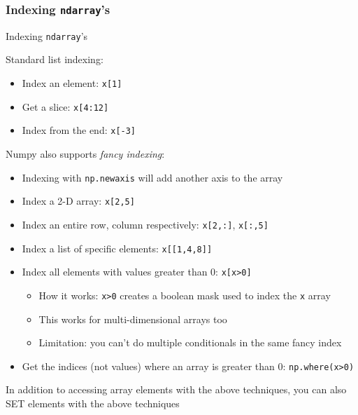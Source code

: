 \documentclass{beamer}
\newcommand{\code}[1]{\texttt{#1}}
\begin{document}
\begin{frame}	
	\frametitle{Indexing \code{ndarray}'s}
	
	\begin{block}{Indexing \code{ndarray}'s}
		\begin{scriptsize}
		Standard list indexing:
		\begin{itemize}
			\item Index an element: \code{x[1]}
			\item Get a slice: \code{x[4:12]}
			\item Index from the end: \code{x[-3]}
		\end{itemize}
		
		Numpy also supports \emph{fancy indexing}:
		\begin{itemize}
			\item Indexing with \code{np.newaxis} will add another axis to the array
			\item Index a 2-D array: \code{x[2,5]}
			\item Index an entire row, column respectively: \code{x[2,:]}, \code{x[:,5]}
			\item Index a list of specific elements: \code{x[[1,4,8]]}
			\item Index all elements with values greater than 0: \code{x[x>0]} \\
			\begin{itemize}
				\scriptsize
				\item How it works: \code{x>0} creates a boolean mask used to index the \code{x} array
				\item This works for multi-dimensional arrays too
				\item Limitation: you can't do multiple conditionals in the same fancy index
			\end{itemize}
			\item Get the indices (not values) where an array is greater than 0: \code{np.where(x>0)}
		\end{itemize}
		
		In addition to accessing array elements with the above techniques, you can also SET elements with the above techniques
		\end{scriptsize}
	\end{block}
	
\end{frame}
\end{document}
